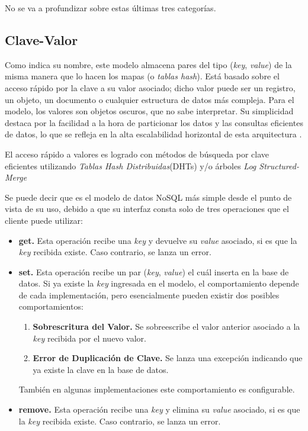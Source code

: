 \documentclass[pdflatex,sn-mathphys-num]{sn-jnl}
\theoremstyle{thmstyleone}%
\theoremstyle{thmstyletwo}%
\theoremstyle{thmstylethree}%
\begin{document}
No se va a profundizar sobre estas últimas tres categorías.

\subsection{Clave-Valor}\label{sec41}

Como indica su nombre, este modelo almacena pares del tipo (\textit{key}, \textit{value}) de la misma manera que lo hacen los mapas (o \textit{tablas hash}). Está basado sobre el acceso rápido por la clave a su valor asociado; dicho valor puede ser un registro, un objeto, un documento o cualquier estructura de datos más compleja. Para el modelo, los valores son objetos oscuros, que no sabe interpretar. Su simplicidad destaca por la facilidad a la hora de particionar los datos y las consultas eficientes de datos, lo que se refleja en la alta escalabilidad horizontal de esta arquitectura \cite{surv}.

El acceso rápido a valores es logrado con métodos de búsqueda por clave eficientes utilizando \textit{Tablas Hash Distribuidas}(DHTs) y/o árboles \textit{Log Structured-Merge}\cite{Atzeni2016DataMI}

Se puede decir que es el modelo de datos NoSQL más simple desde el punto de vista de su uso, debido a que su interfaz consta solo de tres operaciones que el cliente puede utilizar:

\begin{itemize}
    \item \textbf{get.} Esta operación recibe una \textit{key} y devuelve su \textit{value} asociado, si es que la \textit{key} recibida existe. Caso contrario, se lanza un error.
    
    \item \textbf{set.} Esta operación recibe un par (\textit{key}, \textit{value}) el cuál inserta en la base de datos. Si ya existe la \textit{key} ingresada en el modelo, el comportamiento depende de cada implementación, pero esencialmente pueden existir dos posibles comportamientos:

    \begin{enumerate}
        \item \textbf{Sobrescritura del Valor.} Se sobreescribe el valor anterior asociado a la \textit{key} recibida por el nuevo valor.
        \item \textbf{Error de Duplicación de Clave.} Se lanza una excepción indicando que ya existe la clave en la base de datos.
    \end{enumerate}

    También en algunas implementaciones este comportamiento es configurable.
    
    \item \textbf{remove.} Esta operación recibe una \textit{key} y elimina su \textit{value} asociado, si es que la \textit{key} recibida existe. Caso contrario, se lanza un error.
\end{itemize}
\end{document}
